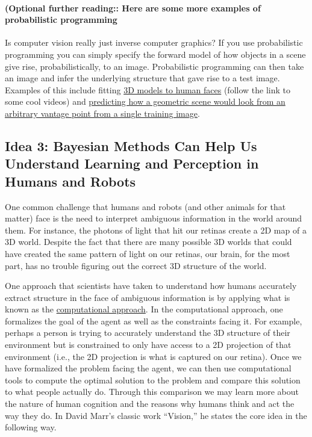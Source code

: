 \documentclass[assignment01_Solutions]{subfiles}
\begin{document}
\paragraph{(Optional further reading:: Here are some more examples of probabilistic programming}
Is computer vision really just inverse computer graphics?  If you use probabilistic programming you can simply specify the forward model of how objects in a scene give rise, probabilistically, to an image. Probabilistic programming can then take an image and infer the underlying structure that gave rise to a test image.  Examples of this include fitting  \href{http://mrkulk.github.io/www_cvpr15/}{3D models to human faces} (follow the link to some cool videos) and \href{https://science.sciencemag.org/content/sci/360/6394/1204.full.pdf}{predicting how a geometric scene would look from an arbitrary vantage point from a single training image}.


\subsection*{Idea 3: Bayesian Methods Can Help Us Understand Learning and Perception in Humans and Robots}

One common challenge that humans and robots (and other animals for that matter) face is the need to interpret ambiguous information in the world around them.  For instance, the photons of light that hit our retinas create a 2D map of a 3D world.  Despite the fact that there are many possible 3D worlds that could have created the same pattern of light on our retinas, our brain, for the most part, has no trouble figuring out the correct 3D structure of the world.

One approach that scientists have taken to understand how humans accurately extract structure in the face of ambiguous information is by applying what is known as the \href{https://www.cse.huji.ac.il/~yweiss/intro/node2.html}{computational approach}.  In the computational approach, one formalizes the goal of the agent as well as the constraints facing it.  For example, perhaps a person is trying to accurately understand the 3D structure of their environment but is constrained to only have access to a 2D projection of that environment (i.e., the 2D projection is what is captured on our retina).  Once we have formalized the problem facing the agent, we can then use computational tools to compute the optimal solution to the problem and compare this solution to what people actually do.  Through this comparison we may learn more about the nature of human cognition and the reasons why humans think and act the way they do.  In David Marr's classic work ``Vision,'' he states the core idea in the following way.
\end{document}
